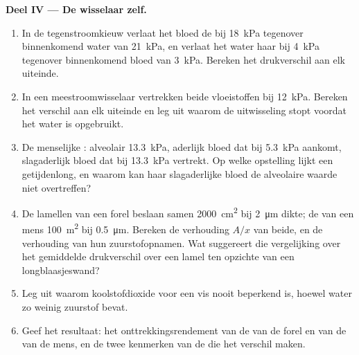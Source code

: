 \begin{problem}
\medskip
\noindent\textbf{Deel IV --- De wisselaar zelf.}
\begin{enumerate}[resume]
  \item In de tegenstroomkieuw verlaat het bloed de  bij
        \qty{18}{kPa} tegenover binnenkomend water van \qty{21}{kPa}, en
        verlaat het water haar bij \qty{4}{kPa} tegenover binnenkomend
        bloed van \qty{3}{kPa}. Bereken het drukverschil aan elk uiteinde.
  \item In een meestroomwisselaar vertrekken beide vloeistoffen bij
        \qty{12}{kPa}. Bereken het verschil aan elk uiteinde en leg uit
        waarom de uitwisseling stopt voordat het water is opgebruikt.
  \item De menselijke : alveolair \qty{13.3}{kPa}, aderlijk bloed dat
        bij \qty{5.3}{kPa} aankomt, slagaderlijk bloed dat bij
        \qty{13.3}{kPa} vertrekt. Op welke opstelling lijkt een
        getijdenlong, en waarom kan haar slagaderlijke bloed de alveolaire
        waarde niet overtreffen?
  \item De lamellen van een forel beslaan samen \qty{2000}{cm^2} bij
        \qty{2}{\micro m} dikte; de  van een mens
        \qty{100}{m^2} bij \qty{0.5}{\micro m}. Bereken de verhouding
        $A/x$ van beide, en de verhouding van hun zuurstofopnamen. Wat
        suggereert die vergelijking over het gemiddelde drukverschil over
        een lamel ten opzichte van een longblaasjeswand?
  \item Leg uit waarom koolstofdioxide voor een vis nooit beperkend is,
        hoewel water zo weinig zuurstof bevat.
  \item Geef het resultaat: het onttrekkingsrendement van de  van de
        forel en van de  van de mens, en de twee kenmerken van de
         die het verschil maken.
\end{enumerate}
\end{problem}
